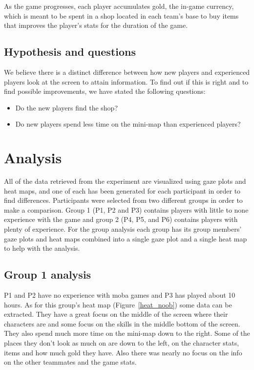 \documentclass[notitlepage]{report}
\begin{document}
As the game progresses, each player accumulates gold, the in-game currency, which is meant to be spent in a shop located in each team's base to buy items that improves the player's stats for the duration of the game.

\section{Hypothesis and questions}
We believe there is a distinct difference between how new players and experienced players look at the screen to attain information. To find out if this is right and to find possible improvements, we have stated the following questions:

\begin{itemize}
\item Do the new players find the shop?
\item Do new players spend less time on the mini-map than experienced players?
\end{itemize}

\chapter{Analysis}
All of the data retrieved from the experiment are visualized using gaze plots and heat maps, and one of each has been generated for each participant in order to find differences. Participants were selected from two different groups in order to make a comparison. Group 1 (P1, P2 and P3) contains players with little to none experience with the game and group 2 (P4, P5, and P6) contains players with plenty of experience. For the group analysis each group has its group members' gaze plots and heat maps combined into a single gaze plot and a single heat map to help with the analysis.

\section{Group 1 analysis}
P1 and P2 have no experience with moba games and P3 has played about 10 hours. As for this group's heat map (Figure~\ref{heat_noob}) some data can be extracted. They have a great focus on the middle of the screen where their characters are and some focus on the skills in the middle bottom of the screen. They also spend much more time on the mini-map down to the right. Some of the places they don't look as much on are down to the left, on the character stats, items and how much gold they have. Also there was nearly no focus on the info on the other teammates and the game stats.
\end{document}
